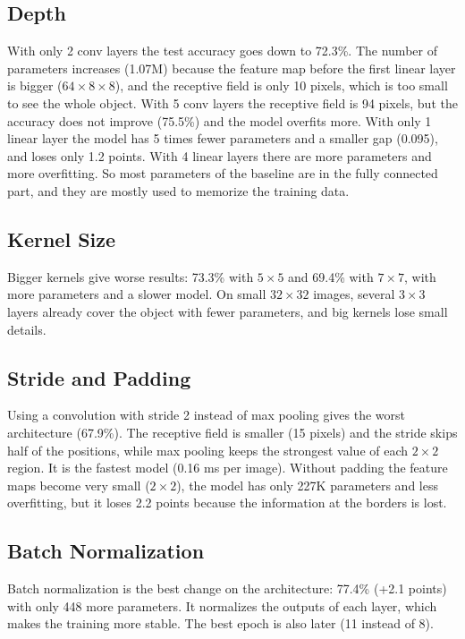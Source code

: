 \documentclass[conference]{IEEEtran}
\begin{document}
\subsection{Depth}
With only 2 conv layers the test accuracy goes down to 72.3\%. The number of parameters increases (1.07M) because the
feature map before the first linear layer is bigger ($64\times8\times8$), and the receptive field is only 10 pixels,
which is too small to see the whole object. With 5 conv layers the receptive field is 94 pixels, but the accuracy does
not improve (75.5\%) and the model overfits more. With only 1 linear layer the model has 5 times fewer parameters and a
smaller gap (0.095), and loses only 1.2 points. With 4 linear layers there are more parameters and more overfitting.
So most parameters of the baseline are in the fully connected part, and they are mostly used to memorize the training
data.

\subsection{Kernel Size}
Bigger kernels give worse results: 73.3\% with $5\times5$ and 69.4\% with $7\times7$, with more parameters and a
slower model. On small $32\times32$ images, several $3\times3$ layers already cover the object with fewer parameters,
and big kernels lose small details.

\subsection{Stride and Padding}
Using a convolution with stride 2 instead of max pooling gives the worst architecture (67.9\%). The receptive field is
smaller (15 pixels) and the stride skips half of the positions, while max pooling keeps the strongest value of each
$2\times2$ region. It is the fastest model (0.16 ms per image). Without padding the feature maps become very small ($2\times2$),
the model has only 227K parameters and less overfitting, but it loses 2.2 points because the information at the
borders is lost.

\subsection{Batch Normalization}
Batch normalization is the best change on the architecture: 77.4\% (+2.1 points) with only 448 more parameters. It
normalizes the outputs of each layer, which makes the training more stable. The best epoch is also later (11 instead of
8).
\end{document}
